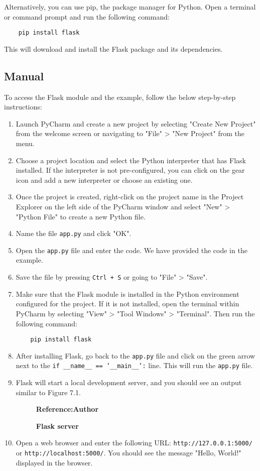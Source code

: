 Alternatively, you can use pip, the package manager for Python. Open a terminal or command prompt and run the following command:
\begin{verbatim}
	pip install flask
\end{verbatim}
This will download and install the Flask package and its dependencies.

\subsection{Manual}
To access the Flask module and the example, follow the below step-by-step instructions:

\begin{enumerate}
	\item Launch PyCharm and create a new project by selecting "Create New Project" from the welcome screen or navigating to "File" > "New Project" from the menu.
	\item Choose a project location and select the Python interpreter that has Flask installed. If the interpreter is not pre-configured, you can click on the gear icon and add a new interpreter or choose an existing one.
	\item Once the project is created, right-click on the project name in the Project Explorer on the left side of the PyCharm window and select "New" > "Python File" to create a new Python file.
	\item Name the file \texttt{app.py} and click "OK".
	\item Open the \texttt{app.py} file and enter the code. We have provided the code in the example.
	\item Save the file by pressing \texttt{Ctrl + S} or going to "File" > "Save".
	\item Make sure that the Flask module is installed in the Python environment configured for the project. If it is not installed, open the terminal within PyCharm by selecting "View" > "Tool Windows" > "Terminal". Then run the following command: 
\begin{verbatim}
	pip install flask
\end{verbatim}
	\item After installing Flask, go back to the \texttt{app.py} file and click on the green arrow next to the \texttt{if \_\_name\_\_ == '\_\_main\_\_':} line. This will run the \texttt{app.py} file.
	\item Flask will start a local development server, and you should see an output similar to Figure 7.1.
	\begin{figure}
		\centering
		\caption{\textbf{Flask server}}
		\footnotesize \textbf{Reference:Author}
		\label{fig:Flask server}
	\end{figure}
	\item Open a web browser and enter the following URL: \texttt{http://127.0.0.1:5000/} or \texttt{http://localhost:5000/}. You should see the message "Hello, World!" displayed in the browser.
\end{enumerate}



